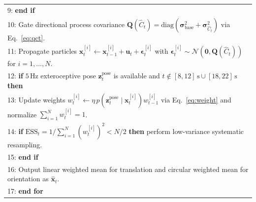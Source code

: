 \documentclass[11pt, a4paper]{article}
\begin{document}
\begin{table}[htbp]
\begin{tabularx}{\textwidth}{X}
        9: \hspace*{1.5em} \textbf{end if} \\
        10: \hspace*{1.5em} Gate directional process covariance $\mathbf{Q}(\hat{C}_t) = \mathrm{diag}(\bm{\sigma}_{\text{base}}^2 + \bm{\sigma}_{\hat{C}_t}^2)$ via Eq.~\eqref{eq:qct}. \\
        11: \hspace*{1.5em} Propagate particles $\mathbf{x}_t^{[i]} \gets \mathbf{x}_{t-1}^{[i]} + \mathbf{u}_t + \bm{\epsilon}_t^{[i]}$ with $\bm{\epsilon}_t^{[i]} \sim \mathcal{N}(\mathbf{0}, \mathbf{Q}(\hat{C}_t))$ for $i = 1,\dots,N$. \\
        12: \hspace*{1.5em} \textbf{if} $5\,\text{Hz}$ exteroceptive pose $\mathbf{z}_t^{\text{pose}}$ is available and $t \notin [8,12]\,\text{s} \cup [18,22]\,\text{s}$ \textbf{then} \\
        13: \hspace*{3.0em} Update weights $w_t^{[i]} \gets \eta\, p(\mathbf{z}_t^{\text{pose}} \mid \mathbf{x}_t^{[i]}) w_{t-1}^{[i]}$ via Eq.~\eqref{eq:weight} and normalize $\sum_{i=1}^N w_t^{[i]} = 1$. \\
        14: \hspace*{3.0em} \textbf{if} $\mathrm{ESS}_t = 1/\sum_{i=1}^N (w_t^{[i]})^2 < N/2$ \textbf{then} perform low-variance systematic resampling. \\
        15: \hspace*{1.5em} \textbf{end if} \\
        16: \hspace*{1.5em} Output linear weighted mean for translation and circular weighted mean for orientation as $\hat{\mathbf{x}}_t$. \\
        17: \textbf{end for} \\
        \bottomrule
    \end{tabularx}
\end{table}
\end{document}
